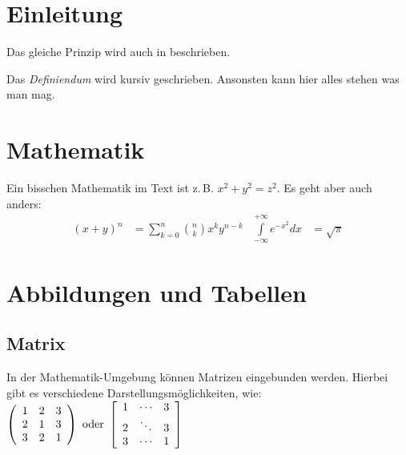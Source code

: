 \section{Einleitung}
\label{sec:einleitung}

\blindtext
Das gleiche Prinzip wird auch in \cite{clarke} beschrieben.



\begin{definition}
	Das \textit{Definiendum} wird kursiv geschrieben. Ansonsten kann hier alles stehen was man mag.
\end{definition}

\section{Mathematik}
\label{sec:mathematik}

Ein bisschen Mathematik im Text ist z.\,B. $x^2 + y^2 = z^2$.
Es geht aber auch anders:
\begin{align*}
  {(x+y)}^n & = \sum\limits_{k=0}^{n} \binom{n}{k} x^k y^{n-k}
  & \int\limits_{-\infty}^{+\infty} e^{-x^2} dx & = \sqrt{\pi}
\end{align*}

\section{Abbildungen und Tabellen}
\label{sec:abbildungen}

\subsection{Matrix}
In der Mathematik-Umgebung können Matrizen eingebunden werden. Hierbei gibt es verschiedene Darstellungsmöglichkeiten, wie: 
$
\left(
	\begin{array}{c c c}
	1 & 2 & 3 \\
	2 & 1 & 3 \\
	3 & 2 & 1 \\
	\end{array}
\right)
 \text{ oder }
\left[
\begin{array}{c c c}
1 & \cdots & 3 \\
2 & \ddots & 3 \\
3 & \cdots & 1 \\
\end{array}
\right]
$

